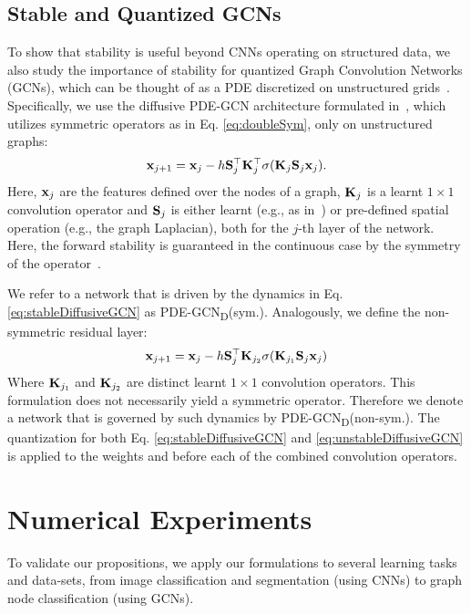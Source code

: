 \documentclass[reqno]{amsart}
\newcommand{\bfx}{ {\bf x}}
\newcommand{\bfK}{{\bf K}}
\newcommand{\bfS}{{\bf S}}
\begin{document}
\subsection{\textbf{Stable and Quantized GCNs}}
\label{sub:stable_gcns}
To show that stability is useful beyond CNNs operating on structured data, we also study the importance of stability for quantized Graph Convolution Networks (GCNs), which can be thought of as a PDE discretized on unstructured grids~\cite{eliasof2020diffgcn}. Specifically, we use the diffusive PDE-GCN architecture formulated in~\cite{eliasof2021pdegcn}, which utilizes symmetric operators as in Eq. \eqref{eq:doubleSym}, only on unstructured graphs:
\begin{equation}
\label{eq:stableDiffusiveGCN}
    \bfx_{j+1} = \bfx_j - h \bfS_j^{\top} \bfK_j^{\top} \sigma(\bfK_j \bfS_j \bfx_j).
\end{equation}
Here, $\bfx _j$ are the features defined over the nodes of a graph, $\bfK_j$ is a learnt $1\times1$ convolution operator and $\bfS_j$ is either learnt (e.g., as in~\cite{eliasof2020diffgcn}) or pre-defined spatial operation (e.g., the graph Laplacian), both for the $j$-th layer of the network. Here, the forward stability is guaranteed in the continuous case by the symmetry of the operator~\cite{eliasof2021pdegcn}. 

We refer to a network that is driven by the dynamics in Eq. \eqref{eq:stableDiffusiveGCN} as PDE-GCN\textsubscript{D}(sym.). Analogously, we define the non-symmetric residual layer:
\begin{equation}
\label{eq:unstableDiffusiveGCN}
    \bfx_{j+1} = \bfx_j - h \bfS_j^{\top} \bfK_{j_2} \sigma(\bfK_{j_{1}} \bfS_j \bfx_j)
\end{equation}
Where $\bfK_{j_{1}}$ and $\bfK_{j_{2}}$ are distinct learnt $1\times 1$ convolution operators. This formulation does not necessarily yield a symmetric operator. Therefore we denote a network that is governed by such dynamics by PDE-GCN\textsubscript{D}(non-sym.). The quantization for both Eq. \eqref{eq:stableDiffusiveGCN} and \eqref{eq:unstableDiffusiveGCN} is applied to the weights and before each of the combined convolution operators. 

\section{Numerical Experiments}
\label{sec:experiments}
To validate our propositions, we apply our formulations to several learning tasks and data-sets, from image classification and segmentation (using CNNs) to graph node classification (using GCNs).
\end{document}
